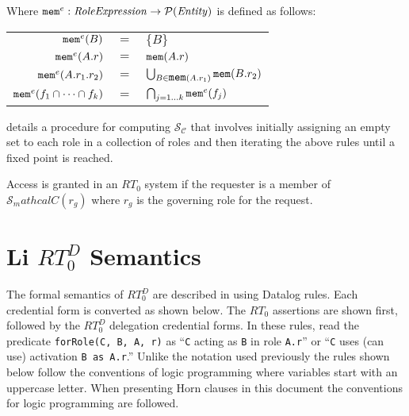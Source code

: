 \documentclass{article}
\newcommand{\predicate}[1]{\texttt{#1}}
\newcommand{\activate}[2]{\texttt{#1 as #2}}
\begin{document}
Where $\mbox{\texttt{mem}}^e : \mbox{\textit{RoleExpression}} \rightarrow
\mathcal{P}(\mbox{\textit{Entity}})$ is defined as follows:

\begin{tabular}{rcl}
$\mbox{\texttt{mem}}^e(B)$ & $=$ & $\{ B \}$ \\
$\mbox{\texttt{mem}}^e(A.r)$ & $=$ & $\mbox{\texttt{mem}}(A.r)$ \\
$\mbox{\texttt{mem}}^e(A.r_1.r_2)$ & $=$ & $\bigcup_{B \in \mbox{\texttt{mem}}(A.r_1)} \mbox{\texttt{mem}}(B.r_2)$ \\
$\mbox{\texttt{mem}}^e(f_1 \cap \cdots \cap f_k)$ & $=$ & $\bigcap_{j = 1 \ldots k} \mbox{\texttt{mem}}^e(f_j)$
\end{tabular}

\cite{Li:2003-02} details a procedure for computing $\mathcal{S}_\mathcal{C}$ that involves
initially assigning an empty set to each role in a collection of roles and then iterating the
above rules until a fixed point is reached.

Access is granted in an $RT_0$ system if the requester is a member of
$\mathcal{S}_mathcal{C}(r_g)$ where $r_g$ is the governing role for the request.

\section{Li $RT_0^D$ Semantics}
\label{sec:RT0D-semantics}

The formal semantics of $RT_0^D$ are described in \cite{Li:2002-05} using Datalog rules. Each
credential form is converted as shown below. The $RT_0$ assertions are shown first, followed by
the $RT_0^D$ delegation credential forms. In these rules, read the predicate
\predicate{forRole(C, B, A, r)} as ``\texttt{C} acting as \texttt{B} in role \texttt{A.r}'' or
``\texttt{C} uses (can use) activation \activate{B}{A.r}.'' Unlike the notation used previously
the rules shown below follow the conventions of logic programming where variables start with an
uppercase letter. When presenting Horn clauses in this document the conventions for logic
programming are followed.
\end{document}
